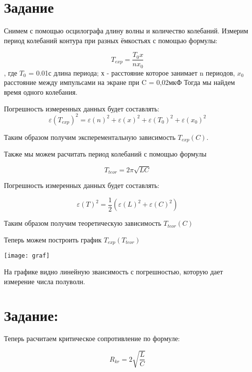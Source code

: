 \documentclass[a4paper,12pt]{article}
\begin{document}
	\section{Задание}

	 Снимем с помощью осцилографа длину волны и количество колебаний.
	 Измерим период колебаний контура при разных ёмкостьях с помощью формулы:
	 
	 \begin{equation}
	 T_{exp}=\frac{T_0x}{nx_0}
	 \end{equation}
	 , где $T_0$ = 0.01с длина периода; х - расстояние которое занимает n периодов, $x_0$ расстояние между импульсами на экране при C = 0,02мкФ
	 Тогда мы найдем время одного колебания. 
	 
	 Погрешность измеренных данных будет составлять:
	 \begin{equation}
	 \varepsilon(T_{exp})^2	= \varepsilon(n)^2 + \varepsilon(x)^2 + \varepsilon(T_0)^2 + \varepsilon(x_0)^2
	 \end{equation}
	 
	 Таким образом получим эксперементальную зависимость $T_{exp}(C)$.
	 
	 Также мы можем расчитать период колебаний с помощью формулы
	 
	 \begin{equation}
	 T_{teor} = 2 \pi \sqrt{LC}
	 \end{equation}
	 
	 Погрешность измеренных данных будет составлять:
	 
	 \begin{equation}
	 \varepsilon(T)^2 = \frac{1}2(\varepsilon(L)^2+\varepsilon(C)^2)
	 \end{equation}
	 
	 Таким образом получим теоретическую зависимость $T_{teor}(C)$
	 
	 Теперь можем построить график $T_{exp} (T_{teor})$
	 
	 \texttt{[image: graf]}
	 
	 
	 На графике видно линейную зваисимость с погрешностью, которую дает измерение числа полуволн.
	 
	 \section{Задание:}
	 
	 Теперь расчитаем критическое сопротивление по формуле:
	 
	 \begin{equation}
	 R_{kr}=2\sqrt{\frac{L}C}
	 \end{equation}
	 
\end{document}
